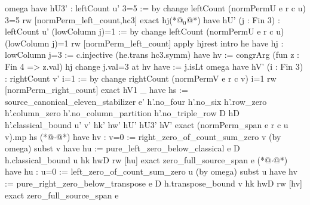           omega
        have hU3' : leftCount u' 3=5 := by
          change leftCount (normPermU e r c u) 3=5
          rw [normPerm_left_count,hc3]
          exact hj(*@${}_0$@*)
        have hU' (j : Fin 3) : leftCount u' (lowColumn j)=1 := by
          change leftCount (normPermU e r c u) (lowColumn j)=1
          rw [normPerm_left_count]
          apply hjrest
          intro he
          have hj : lowColumn j=3 := c.injective (he.trans hc3.symm)
          have hv := congrArg (fun z : Fin 4 => z.val) hj
          change j.val=3 at hv
          have := j.isLt
          omega
        have hV' (i : Fin 3) : rightCount v' i=1 := by
          change rightCount (normPermV e r c v) i=1
          rw [normPerm_right_count]
          exact hV1 _
        have hs := source_canonical_eleven_stabilizer e' h'.no_four h'.no_six h'.row_zero h'.column_zero
          h'.no_column_partition h'.no_triple_row D hD h'.classical_bound u' v' hk' hw' hU' hU3' hV'
        exact (normPerm_span e r c u v).mp hs
    (*@$\cdot$@*) have hv : v=0 := right_zero_of_count_sum_zero v (by omega)
      subst v
      have hu := pure_left_zero_below_classical e D h.classical_bound u hk hwD
      rw [hu]
      exact zero_full_source_span e
  (*@$\cdot$@*) have hu : u=0 := left_zero_of_count_sum_zero u (by omega)
    subst u
    have hv := pure_right_zero_below_transpose e D h.transpose_bound v hk hwD
    rw [hv]
    exact zero_full_source_span e
